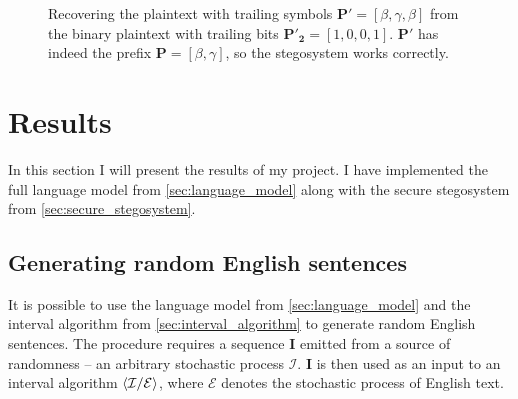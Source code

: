 \documentclass[draft]{IIBproject}
\makeatletter
\DeclarePairedDelimiter{\angled}{\langle}{\rangle}
\DeclareRobustCommand{\intervalAlgorithm}[2]{$\angled{\mathcal{#1} / \mathcal{#2}}$\@\xspace}
\newcommand{\interval}[6] {
	\draw[#6] [i] (#1,#2+#4*#3) -- (#1,#2+#5*#3);
}
\newcommand{\intervalTopLabel}[7] {
	\interval{#1}{#2}{#3}{#4}{#5}{#6}
	\node[#7] at (#1,#2+#5*#3) {\footnotesize #5};
}
\newcommand{\intervalBottomLabel}[7] {
	\interval{#1}{#2}{#3}{#4}{#5}{#6}
	\node[#7] at (#1,#2+#4*#3) {\footnotesize #4};
}
\newcommand{\intervalBothLabels}[7] {
	\intervalBottomLabel{#1}{#2}{#3}{#4}{#5}{#6}{#7}
	\node[#7] at (#1,#2+#5*#3) {\footnotesize #5};
}
\makeatother
\begin{document}
\begin{figure}[h]

	\caption{\label{fig:binary_to_plaintext}Recovering the plaintext with trailing symbols $\mathbf{P'} = [\beta,\gamma,\beta]$ from the binary plaintext with trailing bits $\mathbf{P'_2} = [1,0,0,1]$. $\mathbf {P'}$ has indeed the prefix $\mathbf P = [\beta,\gamma]$, so the stegosystem works correctly.}

\end{figure}

\cleardoublepage
\section{Results}

In this section I will present the results of my project. I have implemented the full language model from \cref{sec:language_model} along with the secure stegosystem from \cref{sec:secure_stegosystem}.

\subsection{Generating random English sentences}

It is possible to use the language model from \cref{sec:language_model} and the interval algorithm from \cref{sec:interval_algorithm} to generate random English sentences. The procedure requires a sequence $\mathbf I$ emitted from a source of randomness -- an arbitrary stochastic process $\mathcal I$. $\mathbf I$ is then used as an input to an interval algorithm \intervalAlgorithm{I}{E}, where $\mathcal E$ denotes the stochastic process of English text.
\end{document}
